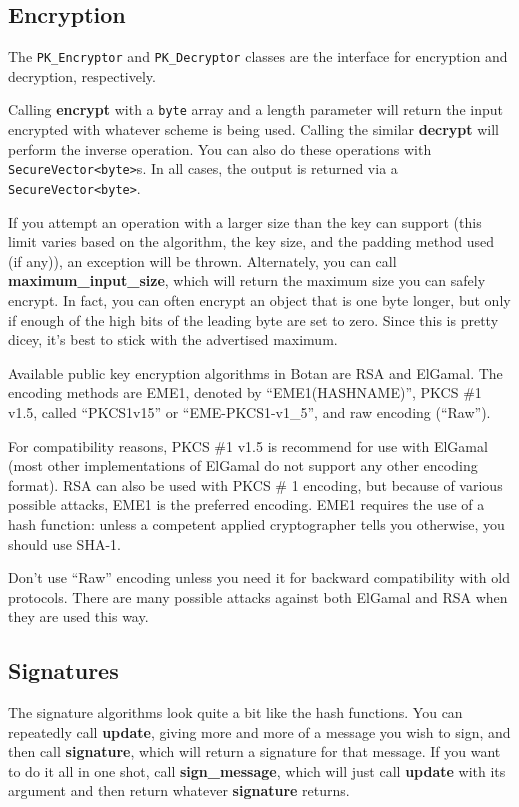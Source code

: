 \documentclass{article}
\newcommand{\function}[1]{\textbf{#1}}
\newcommand{\type}[1]{\texttt{#1}}
\begin{document}
\subsection{Encryption}

The \type{PK\_Encryptor} and \type{PK\_Decryptor} classes are the interface for
encryption and decryption, respectively.

Calling \function{encrypt} with a \type{byte} array and a length parameter will
return the input encrypted with whatever scheme is being used. Calling the
similar \function{decrypt} will perform the inverse operation. You can also do
these operations with \type{SecureVector<byte>}s. In all cases, the output is
returned via a \type{SecureVector<byte>}.

If you attempt an operation with a larger size than the key can support (this
limit varies based on the algorithm, the key size, and the padding method used
(if any)), an exception will be thrown. Alternately, you can call
\function{maximum\_input\_size}, which will return the maximum size you can
safely encrypt. In fact, you can often encrypt an object that is one byte
longer, but only if enough of the high bits of the leading byte are set to
zero. Since this is pretty dicey, it's best to stick with the advertised
maximum.

Available public key encryption algorithms in Botan are RSA and ElGamal. The
encoding methods are EME1, denoted by ``EME1(HASHNAME)'', PKCS \#1 v1.5,
called ``PKCS1v15'' or ``EME-PKCS1-v1\_5'', and raw encoding (``Raw'').

For compatibility reasons, PKCS \#1 v1.5 is recommend for use with ElGamal
(most other implementations of ElGamal do not support any other encoding
format). RSA can also be used with PKCS \# 1 encoding, but because of various
possible attacks, EME1 is the preferred encoding. EME1 requires the use of a
hash function: unless a competent applied cryptographer tells you otherwise,
you should use SHA-1.

Don't use ``Raw'' encoding unless you need it for backward compatibility with
old protocols. There are many possible attacks against both ElGamal and RSA
when they are used this way.

\subsection{Signatures}

The signature algorithms look quite a bit like the hash functions. You can
repeatedly call \function{update}, giving more and more of a message you wish
to sign, and then call \function{signature}, which will return a signature for
that message. If you want to do it all in one shot, call
\function{sign\_message}, which will just call \function{update} with its
argument and then return whatever \function{signature} returns.
\end{document}

